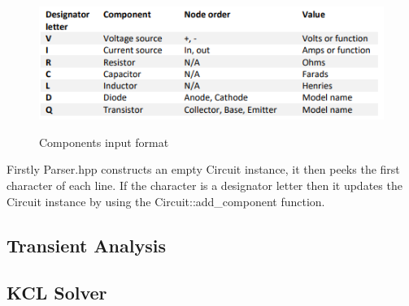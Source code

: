 \documentclass{article}
\begin{document}
\begin{figure}[h]
    \caption{Components input format}
    \centering
    \includegraphics[width=1\textwidth]{images/components_input_format.PNG}
    \label{fig:ComponentsInputFormat}
\end{figure}
Firstly Parser.hpp constructs an empty Circuit instance, it then peeks the first character of each line. If the character is a designator letter then it updates the Circuit instance by using the Circuit::add\_component function.


\subsection{Transient Analysis}
\subsection{KCL Solver}
\newpage
\end{document}
